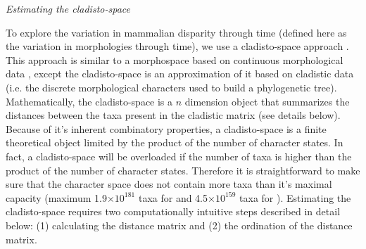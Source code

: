 \documentclass[12pt,letterpaper]{article}
\renewcommand{\subsection}[1]{%
\bigskip
\begin{center}
\begin{large}
\normalfont\itshape #1
\end{large}
\end{center}}
\begin{document}
\subsection{Estimating the cladisto-space}
To explore the variation in mammalian disparity through time (defined here as the variation in morphologies through time), we use a cladisto-space approach \citep{Foote01071994,Foote29111996,Wesley-Hunt2005,Brusatte12092008,Hughes20082013,friedmanexplosive2010,toljagictriassic-jurassic2013}. %
This approach is similar to a morphospace based on continuous morphological data \citep[e.g.][]{friedmanexplosive2010,finlay2015morphological}, except the cladisto-space is an approximation of it based on cladistic data (i.e. the discrete morphological characters used to build a phylogenetic tree).
Mathematically, the cladisto-space is a $n$ dimension object that summarizes the distances between the taxa present in the cladistic matrix (see details below).
Because of it's inherent combinatory properties, a cladisto-space is a finite theoretical object limited by the product of the number of character states. In fact, a cladisto-space will be overloaded if the number of taxa is higher than the product of the number of character states. Therefore it is straightforward to make sure that the character space does not contain more taxa than it's maximal capacity (maximum 1.9$\times$$10^{181}$ taxa for \cite{Slater2012MEE} and 4.5$\times$$10^{159}$ taxa for \cite{beckancient2014}). %
Estimating the cladisto-space requires two computationally intuitive %
 steps described in detail below: (1) calculating the distance matrix and (2) the ordination of the distance matrix. %
\end{document}
